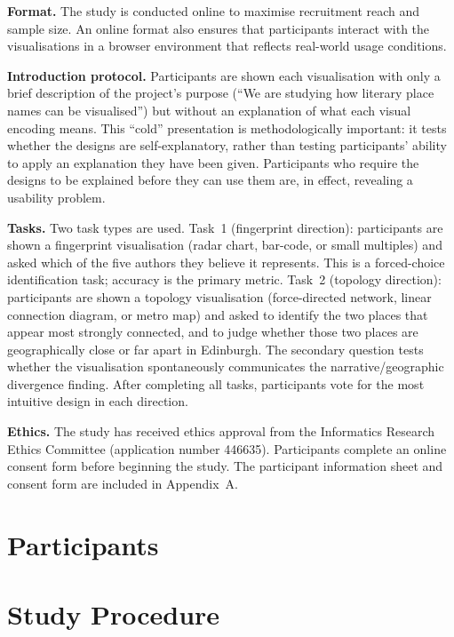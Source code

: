 \documentclass[logo,msc]{infthesis}
\begin{document}
\textbf{Format.} The study is conducted online to maximise recruitment reach and sample size. An online format also ensures that participants interact with the visualisations in a browser environment that reflects real-world usage conditions.
 
\textbf{Introduction protocol.} Participants are shown each visualisation with only a brief description of the project's purpose (``We are studying how literary place names can be visualised'') but without an explanation of what each visual encoding means. This ``cold'' presentation is methodologically important: it tests whether the designs are self-explanatory, rather than testing participants' ability to apply an explanation they have been given. Participants who require the designs to be explained before they can use them are, in effect, revealing a usability problem.
 
\textbf{Tasks.} Two task types are used. Task~1 (fingerprint direction): participants are shown a fingerprint visualisation (radar chart, bar-code, or small multiples) and asked which of the five authors they believe it represents. This is a forced-choice identification task; accuracy is the primary metric. Task~2 (topology direction): participants are shown a topology visualisation (force-directed network, linear connection diagram, or metro map) and asked to identify the two places that appear most strongly connected, and to judge whether those two places are geographically close or far apart in Edinburgh. The secondary question tests whether the visualisation spontaneously communicates the narrative/geographic divergence finding. After completing all tasks, participants vote for the most intuitive design in each direction.
 
\textbf{Ethics.} The study has received ethics approval from the Informatics Research Ethics Committee (application number 446635). Participants complete an online consent form before beginning the study. The participant information sheet and consent form are included in Appendix~A.
 
\section{Participants}
 
\section{Study Procedure}
 
\end{document}
